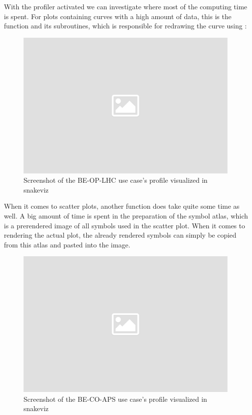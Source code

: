 With the profiler activated we can investigate where most of the computing time
is spent. For plots containing curves with a high amount of data, this is the
function  and its subroutines,
which is responsible for redrawing the curve using
:

\begin{figure}[h]
    \centering
    \includegraphics[width=11cm]{resources/img/placeholder}
    \caption{
        Screenshot of the BE-OP-LHC use case's profile visualized in snakeviz
    }
    \label{fig:application:lhc:usecase:profile}
\end{figure}

When it comes to scatter plots, another function does take quite some time as
well. A big amount of time is spent in the preparation of the symbol atlas,
which is a prerendered image of all symbols used in the scatter plot. When it
comes to rendering the actual plot, the already rendered symbols can simply be
copied from this atlas and pasted into the image.


\begin{figure}[h]
    \centering
    \includegraphics[width=11cm]{resources/img/placeholder}
    \caption{
        Screenshot of the BE-CO-APS use case's profile visualized in snakeviz
    }
    \label{fig:application:aps:usecase:profile}
\end{figure}
